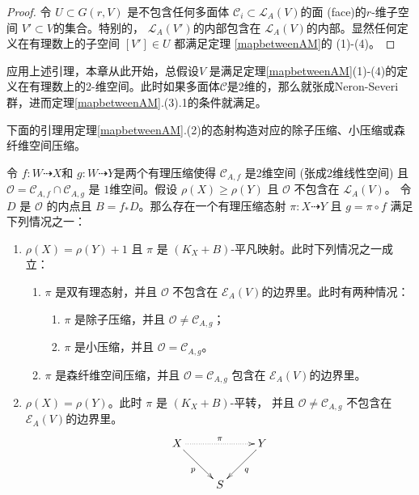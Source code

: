 \begin{proof}
  令 $U \subset G(r, V) $ 是不包含任何多面体 $\mathcal{C}_{i} \subset \mathcal{L}_{A}(V)$的面 (face)的$r$-维子空间  $V' \subset V$的集合。特别的，  $\mathcal{L}_{A}(V')$的内部包含在 $\mathcal{L}_{A}(V)$的内部。显然任何定义在有理数上的子空间 $[V']\in U$ 都满足定理 \ref{mapbetweenAM}的 (1)-(4)。 \end{proof}
\begin{remark}
  应用上述引理，本章从此开始，总假设$V$ 是满足定理\ref{mapbetweenAM}(1)-(4)的定义在有理数上的2-维空间。此时如果多面体$\mathcal{C}$是2维的，那么就张成Neron-Severi群，进而定理\ref{mapbetweenAM}.(3).1的条件就满足。
\end{remark}


下面的引理用定理\ref{mapbetweenAM}.(2)的态射构造对应的除子压缩、小压缩或森纤维空间压缩。 
\begin{lemma}\label{mapbetweenAM2}
  \cite[Lemma 3.5]{haconSarkisovProgram2012} 令 $ f:W\dashrightarrow X $和 $ g:W\dashrightarrow  Y $是两个有理压缩使得 $ \mathcal{C}_{A,f} $ 是2维空间 (张成2维线性空间) 且 $ \mathcal{O}=\mathcal{C}_{A,f}\cap \mathcal{C}_{A,g} $ 是 $ 1 $维空间。假设 $ \rho(X)\geqslant \rho(Y) $ 且 $ \mathcal{O} $ 不包含在 $ \mathcal{L}_{A}(V) $。 令 $ D $ 是 $ \mathcal{O} $ 的内点且 $ B=f_*D $。那么存在一个有理压缩态射 $ \pi:X\dashrightarrow Y $ 且 $ g=\pi\circ f $ 满足下列情况之一：
  \begin{enumerate}
    \item $ \rho(X)=\rho(Y)+1 $ 且 $ \pi  $ 是 $ (K_X+B) $-平凡映射。此时下列情况之一成立：
          \begin{enumerate}
            \item $ \pi $ 是双有理态射，并且 $ \mathcal{O} $ 不包含在 $ \mathcal{E}_A(V) $的边界里。此时有两种情况：
                  \begin{enumerate}
                    \item $ \pi $ 是除子压缩，并且 $ \mathcal{O}\neq \mathcal{C}_{A,g} $；
                    \item $ \pi $ 是小压缩，并且 $ \mathcal{O}= \mathcal{C}_{A,g} $。
                  \end{enumerate}
            \item $ \pi $ 是森纤维空间压缩，并且 $ \mathcal{O}=\mathcal{C}_{A,g} $ 包含在 $ \mathcal{E}_{A}(V) $的边界里。
          \end{enumerate}
    \item $ \rho(X)=\rho(Y) $。此时  $ \pi $ 是 $ (K_X+B) $-平转， 并且 $ \mathcal{O}\neq\mathcal{C}_{A,g} $ 不包含在 $ \mathcal{E}_A(V) $的边界里。
      \[ \xymatrix{
          X\ar[rd]_{p} \ar@{.>}[rr]^{\pi} & & Y\ar[ld]^{q} \\
        & S &
        } \]
  \end{enumerate}
\end{lemma}
